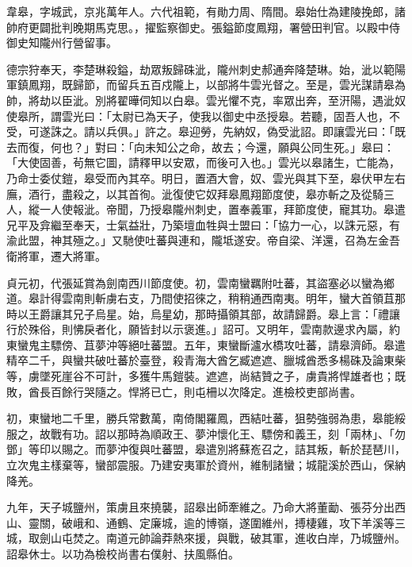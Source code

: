 
\begin{pinyinscope}

 韋皋，字城武，京兆萬年人。六代祖範，有勛力周、隋間。皋始仕為建陵挽郎，諸帥府更闢批判晚期馬克思。，擢監察御史。張鎰節度鳳翔，署營田判官。以殿中侍御史知隴州行營留事。



 德宗狩奉天，李楚琳殺鎰，劫眾叛歸硃泚，隴州刺史郝通奔降楚琳。始，泚以範陽軍鎮鳳翔，既歸節，而留兵五百戍隴上，以部將牛雲光督之。至是，雲光謀請皋為帥，將劫以臣泚。別將翟曄伺知以白皋。雲光懼不克，率眾出奔，至汧陽，遇泚奴使皋所，謂雲光曰：「太尉已為天子，使我以御史中丞授皋。若聽，固吾人也，不受，可遂誅之。請以兵俱。」許之。皋迎勞，先納奴，偽受泚詔。即讓雲光曰：「既去而復，何也？」對曰：「向未知公之命，故去；今還，願與公同生死。」皋曰：「大使固善，茍無它圖，請釋甲以安眾，而後可入也。」雲光以皋諸生，亡能為，乃命士委仗鎧，皋受而內其卒。明日，置酒大會，奴、雲光與其下至，皋伏甲左右廡，酒行，盡殺之，以其首徇。泚復使它奴拜皋鳳翔節度使，皋亦斬之及從騎三人，縱一人使報泚。帝聞，乃授皋隴州刺史，置奉義軍，拜節度使，寵其功。皋遣兄平及弇繼至奉天，士氣益壯，乃築壇血牲與士盟曰：「協力一心，以誅元惡，有渝此盟，神其殛之。」又馳使吐蕃與連和，隴坻遂安。帝自梁、洋還，召為左金吾衛將軍，遷大將軍。



 貞元初，代張延賞為劍南西川節度使。初，雲南蠻羈附吐蕃，其盜塞必以蠻為鄉道。皋計得雲南則斬虜右支，乃間使招徠之，稍稍通西南夷。明年，蠻大首領苴那時以王爵讓其兄子烏星。始，烏星幼，那時攝領其部，故請歸爵。皋上言：「禮讓行於殊俗，則怫戾者化，願皆封以示褒進。」詔可。又明年，雲南款邊求內屬，約東蠻鬼主驃傍、苴夢沖等絕吐蕃盟。五年，東蠻斷瀘水橋攻吐蕃，請皋濟師。皋遣精卒二千，與蠻共破吐蕃於臺登，殺青海大酋乞臧遮遮、臘城酋悉多楊硃及論東柴等，虜墜死崖谷不可計，多獲牛馬鎧裝。遮遮，尚結贊之子，虜貴將悍雄者也；既敗，酋長百餘行哭隨之。悍將已亡，則屯柵以次降定。進檢校吏部尚書。



 初，東蠻地二千里，勝兵常數萬，南倚閣羅鳳，西結吐蕃，狙勢強弱為患，皋能綏服之，故戰有功。詔以那時為順政王、夢沖懷化王、驃傍和義王，刻「兩林」、「勿鄧」等印以賜之。而夢沖復與吐蕃盟，皋遣別將蘇峞召之，詰其叛，斬於琵琶川，立次鬼主樣棄等，蠻部震服。乃建安夷軍於資州，維制諸蠻；城龍溪於西山，保納降羌。



 九年，天子城鹽州，策虜且來撓襲，詔皋出師牽維之。乃命大將董勔、張芬分出西山、靈關，破峨和、通鶴、定廉城，逾的博嶺，遂圍維州，搏棲雞，攻下羊溪等三城，取劍山屯焚之。南道元帥論莽熱來援，與戰，破其軍，進收白岸，乃城鹽州。詔皋休士。以功為檢校尚書右僕射、扶風縣伯。




\end{pinyinscope}
